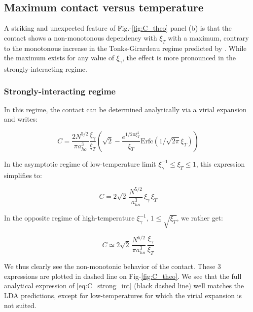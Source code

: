 \subsection{Maximum contact versus temperature}

A striking and unexpected feature of Fig.-\ref{fig:C_theo} panel (b) is that the contact shows a non-monotonous dependency with $\xi_T$ with a maximum, contrary to the monotonous increase in the Tonks-Girardeau regime predicted by \cite{vignolo2013universal}. While the maximum exists for any value of $\xi_{\gamma}$, the effect is more pronounced in the strongly-interacting regime. 

\subsubsection{Strongly-interacting regime}

In this regime, the contact can be determined analytically via a virial expansion \cite{vignolo2013universal} and writes:

\begin{equation}
    C = \frac{2 N^{5/2}}{\pi a_{ho}^3} \frac{\xi_\gamma}{\xi_T} \left( \sqrt{2} - \frac{e^{1/2 \pi \xi_T^2}}{\xi_T} \textrm{Erfc}(1/\sqrt{2 \pi} \xi_T) \right)
    \label{eq:C_strong_int}
\end{equation}

In the asymptotic regime of low-temperature limit $\xi_\gamma^{-1} \leq \xi_T \leq 1$, this expression simplifies to:

\begin{equation}
    C = 2 \sqrt{2} \, \frac{N^{5/2}}{a_{ho}^3} \, \xi_\gamma \, \xi_T 
    \label{eq:strong_int_lowT}
\end{equation}

\noindent In the opposite regime of high-temperature $\xi_\gamma^{-1}, \, 1 \leq \sqrt{\xi_T}$, we rather get:

\begin{equation}
    C \simeq 2 \sqrt{2} \, \frac{N^{5/2}}{ \pi a_{ho}^3} \, \frac{\xi_\gamma}{\xi_T} 
    \label{eq:BS_strong_int_highT}
\end{equation}

\noindent We thus clearly see the non-monotonic behavior of the contact. These 3 expressions are plotted in dashed line on Fig-\ref{fig:C_theo}. We see that the full analytical expression of \ref{eq:C_strong_int} (black dashed line) well matches the LDA predictions, except for low-temperatures for which the virial expansion is not suited.

